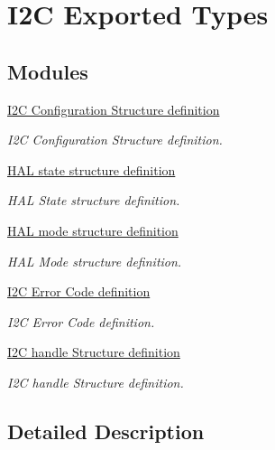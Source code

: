 \hypertarget{group___i2_c___exported___types}{\section{I2\-C Exported Types}
\label{group___i2_c___exported___types}
}
\subsection*{Modules}
\begin{DoxyCompactItemize}
\item 
\hyperlink{group___i2_c___configuration___structure__definition}{I2\-C Configuration Structure definition}
\begin{DoxyCompactList}\small\item\em I2\-C Configuration Structure definition. \end{DoxyCompactList}\item 
\hyperlink{group___h_a_l__state__structure__definition}{H\-A\-L state structure definition}
\begin{DoxyCompactList}\small\item\em H\-A\-L State structure definition. \end{DoxyCompactList}\item 
\hyperlink{group___h_a_l__mode__structure__definition}{H\-A\-L mode structure definition}
\begin{DoxyCompactList}\small\item\em H\-A\-L Mode structure definition. \end{DoxyCompactList}\item 
\hyperlink{group___i2_c___error___code__definition}{I2\-C Error Code definition}
\begin{DoxyCompactList}\small\item\em I2\-C Error Code definition. \end{DoxyCompactList}\item 
\hyperlink{group___i2_c__handle___structure__definition}{I2\-C handle Structure definition}
\begin{DoxyCompactList}\small\item\em I2\-C handle Structure definition. \end{DoxyCompactList}\end{DoxyCompactItemize}


\subsection{Detailed Description}

